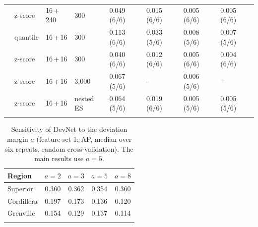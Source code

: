 \documentclass[pdflatex,sn-apa]{sn-jnl}
\begin{document}
\begin{appendices}
\begin{table}[!h]
\begin{tabular*}{\textwidth}{@{\extracolsep\fill}llllllll}
 & z-score & 16\,+\,240 & 300 & 0.049 (6/6) & 0.015 (6/6) & 0.005 (6/6) & 0.005 (6/6) \\
 & quantile & 16\,+\,16 & 300 & 0.113 (6/6) & 0.033 (5/6) & 0.008 (5/6) & 0.007 (5/6) \\
 & z-score & 16\,+\,16 & 300 & 0.040 (6/6) & 0.012 (6/6) & 0.005 (6/6) & 0.004 (6/6) \\
 & z-score & 16\,+\,16 & 3,000 & 0.067 (5/6) & -- & 0.006 (5/6) & -- \\
 & z-score & 16\,+\,16 & nested ES & 0.064 (5/6) & 0.019 (6/6) & 0.005 (5/6) & 0.005 (5/6) \\
\botrule
\end{tabular*}
\end{table}

\begin{table}[!h]
\caption{Sensitivity of DevNet to the deviation margin $a$ (feature set 1; AP, median over six repeats, random cross-validation). The main results use $a = 5$.}\label{tab:margin}
\footnotesize
\begin{tabular*}{0.7\textwidth}{@{\extracolsep\fill}lcccc}
\toprule
Region & $a = 2$ & $a = 3$ & $a = 5$ & $a = 8$ \\
\midrule
Superior & 0.360 & 0.362 & 0.354 & 0.360 \\
Cordillera & 0.197 & 0.173 & 0.136 & 0.120 \\
Grenville & 0.154 & 0.129 & 0.137 & 0.114 \\
\botrule
\end{tabular*}
\end{table}

\end{appendices}

\clearpage


\end{document}

